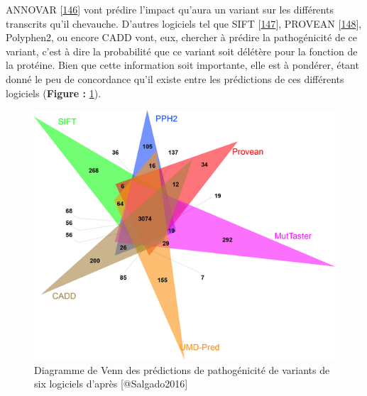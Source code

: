 \documentclass[12pt,twoside]{ugathesis}
\theoremstyle{definition}
\theoremstyle{definition}
\theoremstyle{remark}
\begin{document}
\begin{enumerate}
\begin{enumerate}
    ANNOVAR {[}\protect\hyperlink{ref-Wang2010}{146}{]} vont prédire
    l'impact qu'aura un variant sur les différents transcrits qu'il
    chevauche. D'autres logiciels tel que SIFT
    {[}\protect\hyperlink{ref-Kumar2009}{147}{]}, PROVEAN
    {[}\protect\hyperlink{ref-Choi2012}{148}{]}, Polyphen2, ou encore
    CADD vont, eux, chercher à prédire la pathogénicité de ce variant,
    c'est à dire la probabilité que ce variant soit délétère pour la
    fonction de la protéine. Bien que cette information soit importante,
    elle est à pondérer, étant donné le peu de concordance qu'il existe
    entre les prédictions de ces différents logiciels (\textbf{Figure :}
    \ref{fig:vennpred}).
  \end{enumerate}
\end{enumerate}

\begin{figure}

{\centering \includegraphics[scale=.7]{figure/venn_Diag_patho_pred} 

}

\caption[Diagramme de Venn des prédictions de pathogénicité de variants de six logiciels]{Diagramme de Venn des prédictions de pathogénicité de variants de six logiciels d'après [@Salgado2016]}\label{fig:vennpred}
\end{figure}

\newpage
\end{document}

